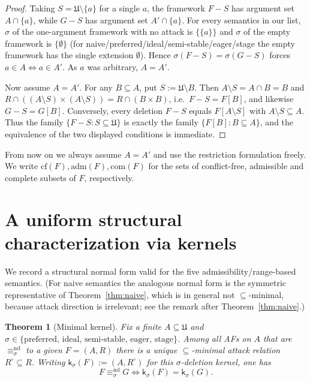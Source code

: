 \documentclass{amsart}
\newtheorem{theorem}{Theorem}
\theoremstyle{remark}
\begin{document}
\begin{proof}
Taking $S=\mathfrak U\setminus\{a\}$ for a single $a$, the framework $F-S$ has
argument set $A\cap\{a\}$, while $G-S$ has argument set $A'\cap\{a\}$.  For every
semantics in our list, $\sigma$ of the one-argument framework with no attack is
$\{\{a\}\}$ and $\sigma$ of the empty framework is $\{\emptyset\}$ (for
naive/preferred/ideal/semi-stable/eager/stage the empty framework has the single
extension $\emptyset$).  Hence $\sigma(F-S)=\sigma(G-S)$ forces
$a\in A\iff a\in A'$.  As $a$ was arbitrary, $A=A'$.

Now assume $A=A'$.  For any $B\subseteq A$, put $S:=\mathfrak U\setminus B$.  Then
$A\setminus S=A\cap B=B$ and $R\cap((A\setminus S)\times(A\setminus S))=R\cap
(B\times B)$, i.e.\ $F-S=F[B]$, and likewise $G-S=G[B]$.  Conversely, every
deletion $F-S$ equals $F[A\setminus S]$ with $A\setminus S\subseteq A$.  Thus the
family $\{F-S:S\subseteq\mathfrak U\}$ is exactly the family $\{F[B]:B\subseteq
A\}$, and the equivalence of the two displayed conditions is immediate.
\end{proof}

From now on we always assume $A=A'$ and use the restriction formulation freely.
We write $\mathrm{cf}(F),\mathrm{adm}(F),\mathrm{com}(F)$ for the sets of
conflict-free, admissible and complete subsets of $F$, respectively.

\section{A uniform structural characterization via kernels}

We record a structural normal form valid for the five admissibility/range-based
semantics.  (For naive semantics the analogous normal form is the symmetric
representative of Theorem~\ref{thm:naive}, which is in general not
$\subseteq$-minimal, because attack direction is irrelevant; see the remark after
Theorem~\ref{thm:naive}.)

\begin{theorem}[Minimal kernel]\label{thm:kernel}
Fix a finite $A\subseteq\mathfrak U$ and $\sigma\in\{\text{preferred, ideal,
semi-stable, eager, stage}\}$.  Among all AFs on $A$ that are
$\equiv^{\mathrm{nd}}_\sigma$ to a given $F=(A,R)$ there is a unique
$\subseteq$-minimal attack relation $R^\circ\subseteq R$.  Writing
$\mathsf k_\sigma(F):=(A,R^\circ)$ for this \emph{$\sigma$-deletion kernel}, one
has
\[
F\equiv^{\mathrm{nd}}_\sigma G\iff \mathsf k_\sigma(F)=\mathsf k_\sigma(G).
\]
\end{theorem}
\end{document}
